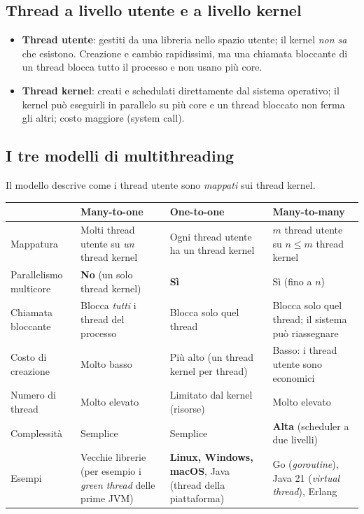 \subsection{Thread a livello utente e a livello kernel}
\begin{itemize}
    \item \textbf{Thread utente}: gestiti da una libreria nello spazio utente; il kernel \emph{non sa} che esistono. Creazione e cambio rapidissimi, ma una chiamata bloccante di un thread blocca tutto il processo e non usano più core.
    \item \textbf{Thread kernel}: creati e schedulati direttamente dal sistema operativo; il kernel può eseguirli in parallelo su più core e un thread bloccato non ferma gli altri; costo maggiore (system call).
\end{itemize}

\subsection{I tre modelli di multithreading}
Il modello descrive come i thread utente sono \emph{mappati} sui thread kernel.

\begin{center}
\small
\begin{tabularx}{\textwidth}{@{}>{\raggedright\arraybackslash}p{2.4cm}XXX@{}}
\toprule
 & \textbf{Many-to-one} & \textbf{One-to-one} & \textbf{Many-to-many} \\
\midrule
Mappatura & Molti thread utente su \emph{un} thread kernel & Ogni thread utente ha un thread kernel & $m$ thread utente su $n \le m$ thread kernel \\
Parallelismo multicore & \textbf{No} (un solo thread kernel) & \textbf{Sì} & Sì (fino a $n$) \\
Chiamata bloccante & Blocca \emph{tutti} i thread del processo & Blocca solo quel thread & Blocca solo quel thread; il sistema può riassegnare \\
Costo di creazione & Molto basso & Più alto (un thread kernel per thread) & Basso: i thread utente sono economici \\
Numero di thread & Molto elevato & Limitato dal kernel (risorse) & Molto elevato \\
Complessità & Semplice & Semplice & \textbf{Alta} (scheduler a due livelli) \\
Esempi & Vecchie librerie (per esempio i \emph{green thread} delle prime JVM) & \textbf{Linux, Windows, macOS}, Java (thread della piattaforma) & Go (\emph{goroutine}), Java 21 (\emph{virtual thread}), Erlang \\
\bottomrule
\end{tabularx}
\end{center}

